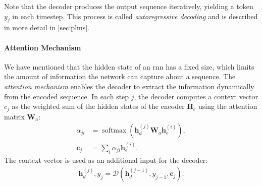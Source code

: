 {Note that the decoder produces the output sequence iteratively, yielding a token $y_j$ in each timestep. This process is called \emph{autoregressive decoding} and is described in more detail in \autoref{sec:plms}.

\paragraph{Attention Mechanism} We have mentioned that the hidden state of an \ac{rnn} has a fixed size, which limits the amount of information the network can capture about a sequence. The \emph{attention mechanism} \cite{bahdanau2015neural} enables the decoder to extract the information dynamically from the encoded sequence. In each step $j$, the decoder computes a context vector $c_j$ as the weighted sum of the hidden states of the encoder $\mathbf{H}_e$ using the attention matrix $\mathbf{W}_a$:
\begin{align}
    \alpha_{ji}  & = \operatorname{softmax}(\mathbf{h}_d^{(j)}\mathbf{W}_a \mathbf{h}_e^{(i)}), \\
    \mathbf{c}_j & = \sum_i \alpha_{ji} \mathbf{h}_e^{(i)}.
\end{align}
The context vector is used as an additional input for the decoder:
\begin{align}
    \mathbf{h}_d^{(j)}, y_j = \mathcal{D}(\mathbf{h}_d^{(j-1)}, y_{j-1}, \mathbf{c}_j).
\end{align}


}
